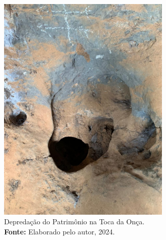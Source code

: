     \begin{figure}[H]
        \centering
        \includegraphics[height=11cm, keepaspectratio]{img/jogo da velha.jpeg}
        \caption{Depredação do Patrimônio na Toca da Onça. \\
            \textbf{Fonte:} Elaborado pelo autor, 2024.}
        \label{fig:degradacao_toca_onca}
    \end{figure}
    
    
    
    
    
    
